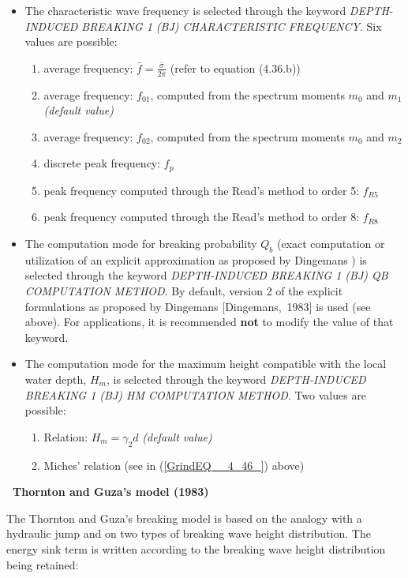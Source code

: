  \begin{itemize}
\item The characteristic wave frequency is selected through the keyword \textit{DEPTH-INDUCED BREAKING 1 (BJ) CHARACTERISTIC FREQUENCY}. Six values are possible:
\begin{enumerate}
 \item average frequency: $\bar{f}=\frac{\bar{\sigma }}{2\pi } $  (refer to equation (4.36.b))
 \item average frequency: $f_{01} $, computed from the spectrum moments $m_0$ and $m_1$ \textit{(default value)}
 \item average frequency: $f_{02} $, computed from the spectrum moments $m_0$ and $m_2$
 \item discrete peak frequency: $f_p$
 \item peak frequency computed through the Read's method to order 5: $f_{R5}$
 \item peak frequency computed through the Read's method to order 8: $f_{R8}$
\end{enumerate}

 \item The computation mode for breaking probability $Q_{b} $ (exact computation or utilization of an explicit approximation as proposed by Dingemans \cite{Dingemans1983}) is selected through the keyword \textit{DEPTH-INDUCED BREAKING 1 (BJ) QB COMPUTATION METHOD}. By default, version 2 of the explicit formulations as proposed by Dingemans [Dingemans,~1983] is used (see above). For applications, it is recommended \textbf{not} to modify the value of that keyword.

 \item The computation mode for the maximum height compatible with the local water depth, $H_{m} $, is selected through the keyword \textit{DEPTH-INDUCED BREAKING 1 (BJ) HM COMPUTATION METHOD}. Two values are possible:
\begin{enumerate}
 \item Relation: $H_{m} =\gamma _{2} d$  \textit{(default value)}
 \item Miches' relation (see in (\ref{GrindEQ__4_46_}) above)
\end{enumerate}
\end{itemize}

{\bf  ~Thornton and Guza's model (1983)}

 The Thornton and Guza's breaking model \cite{Thornton1983} is based on the analogy with a hydraulic jump and on two types of breaking wave height distribution. The energy sink term is written according to the breaking wave height distribution being retained:

